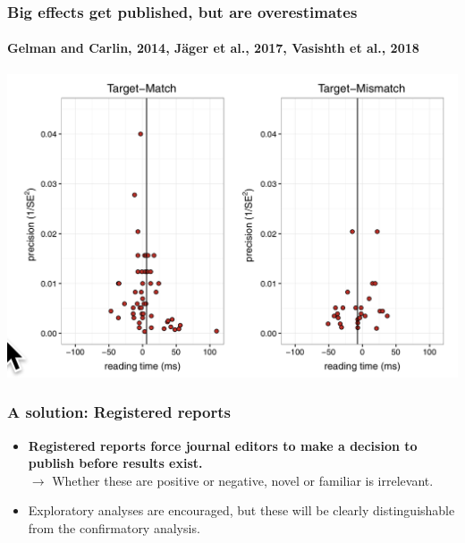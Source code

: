 \documentclass{beamer}
\begin{document}
\begin{frame}
\frametitle{Big effects get published, but are overestimates}
\framesubtitle{Gelman and Carlin, 2014, J\"ager et al., 2017, Vasishth et al., 2018}

\begin{center}
\includegraphics[scale=0.35]{pubbias.png}
\end{center}



\end{frame}




\begin{frame}
\frametitle{A solution: Registered reports}

\begin{itemize}
\item \textbf{Registered reports force journal editors to make a decision to publish before results exist.} \\ \pause
$\rightarrow$ Whether these are positive or negative, novel or familiar is irrelevant.
 \pause
\item Exploratory analyses are encouraged, but these will be clearly distinguishable from the confirmatory analysis. 
\end{itemize}

\end{frame}
\end{document}

